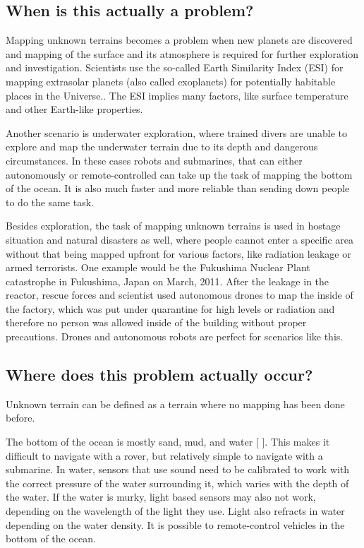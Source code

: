 \subsection{When is this actually a problem?}
Mapping unknown terrains becomes a problem when new planets are discovered and mapping of the surface and its atmosphere is required for further exploration and investigation. Scientists use the so-called Earth Similarity Index (ESI) for mapping extrasolar planets (also called exoplanets) for potentially habitable places in the Universe.\cite{exoplanets}\cite{esi}. The ESI implies many factors, like surface temperature and other Earth-like properties. 

Another scenario is underwater exploration, where trained divers are unable to explore and map the underwater terrain due to its depth and dangerous circumstances. In these cases robots and submarines, that can either autonomously or remote-controlled can take up the task of mapping the bottom of the ocean. It is also much faster and more reliable than sending down people to do the same task.

Besides exploration, the task of mapping unknown terrains is used in hostage situation and natural disasters as well, where people cannot enter a specific area without that being mapped upfront for various factors, like radiation leakage or armed terrorists. One example would be the Fukushima Nuclear Plant catastrophe in Fukushima, Japan on March, 2011. After the leakage in the reactor, rescue forces and scientist used autonomous drones to map the inside of the factory\cite{fukushima}, which was put under quarantine for high levels or radiation and therefore no person was allowed inside of the building without proper precautions. Drones and autonomous robots are perfect for scenarios like this.

\clearpage
\subsection{Where does this problem actually occur?}
Unknown terrain can be defined as a terrain where no mapping has been done before.

The bottom of the ocean is mostly sand, mud, and water [%
]. This makes it difficult to navigate with a rover, but relatively simple to navigate with a submarine. In water, sensors that use sound need to be calibrated to work with the correct pressure of the water surrounding it, which varies with the depth of the water. If the water is murky, light based sensors may also not work, depending on the wavelength of the light they use. Light also refracts in water depending on the water density. It is possible to remote-control vehicles in the bottom of the ocean.

